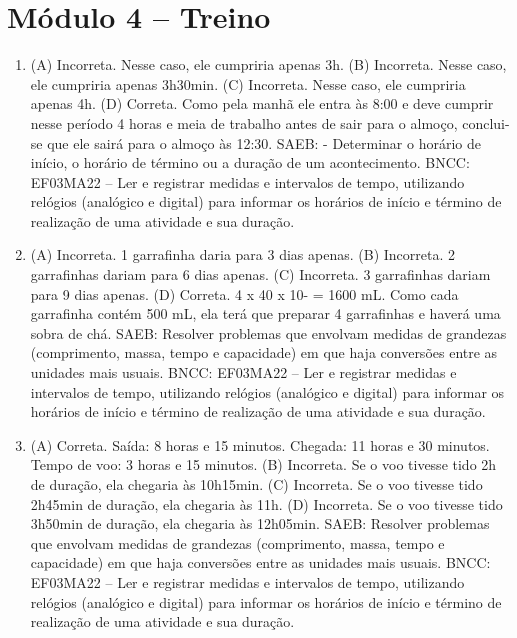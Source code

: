 \section*{Módulo 4 -- Treino}

\begin{enumerate}
\item
(A) Incorreta. Nesse caso, ele cumpriria apenas 3h.
(B) Incorreta. Nesse caso, ele cumpriria apenas 3h30min.
(C) Incorreta. Nesse caso, ele cumpriria apenas 4h.
(D) Correta. Como pela manhã ele entra às 8:00 e deve cumprir nesse período 4 horas e
meia de trabalho antes de sair para o almoço, conclui-se que ele sairá para o almoço às 12:30.
SAEB: - Determinar o horário de início, o horário de término ou a duração de um acontecimento. 
BNCC: EF03MA22 -- Ler e registrar medidas e intervalos de tempo, utilizando relógios (analógico e
digital) para informar os horários de início e término de realização de uma atividade e sua
duração.

\item
(A) Incorreta. 1 garrafinha daria para 3 dias apenas.
(B) Incorreta. 2 garrafinhas dariam para 6 dias apenas.
(C) Incorreta. 3 garrafinhas dariam para 9 dias apenas.
(D) Correta. 4 x 40 x 10- = 1600 mL. Como cada garrafinha contém 500 mL, ela terá que
preparar 4 garrafinhas e haverá uma sobra de chá.
SAEB: Resolver problemas que envolvam medidas de grandezas (comprimento, massa, tempo e capacidade) em que haja conversões entre as unidades mais usuais. 
BNCC: EF03MA22 -- Ler e registrar medidas e intervalos de tempo, utilizando relógios (analógico e
digital) para informar os horários de início e término de realização de uma atividade e sua
duração.

\item
(A) Correta. Saída: 8 horas e 15 minutos. Chegada: 11 horas e 30 minutos. Tempo de voo: 3 horas e 15 minutos.
(B) Incorreta. Se o voo tivesse tido 2h de duração, ela chegaria às 10h15min.
(C) Incorreta. Se o voo tivesse tido 2h45min de duração, ela chegaria às 11h.
(D) Incorreta. Se o voo tivesse tido 3h50min de duração, ela chegaria às 12h05min.
SAEB: Resolver problemas que envolvam medidas de grandezas (comprimento, massa, tempo e capacidade) em que haja conversões entre as unidades mais usuais. 
BNCC: EF03MA22 -- Ler e registrar medidas e intervalos de tempo, utilizando relógios (analógico e
digital) para informar os horários de início e término de realização de uma atividade e sua
duração.
\end{enumerate}

